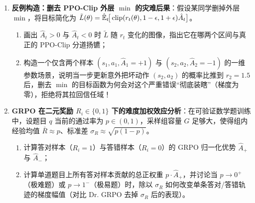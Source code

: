
\begin{enumerate}
  \item[\textbf{6.3.5}] \textbf{反例构造：删去 PPO-Clip 外层 $\min$ 的灾难后果}：假设某同学删掉外层 $\min$，将目标简化为 $\tilde{L}(\theta) = \hat{\mathbb{E}}_t\!\big[\operatorname{clip}(r_t(\theta), 1-\epsilon, 1+\epsilon)\hat{A}_t\big]$。
  \begin{enumerate}
    \item 画出 $\hat{A}_t > 0$ 与 $\hat{A}_t < 0$ 时 $\tilde{L}$ 随 $r_t$ 变化的图像，指出它在哪两个区间与真正的 PPO-Clip 分道扬镳；
    \item 构造一个仅含两个样本 $(s_1, a_1, \hat{A}_1 = +1)$ 与 $(s_2, a_2, \hat{A}_2 = -1)$ 的一维参数场景，说明当一步更新意外把坏动作 $(s_2, a_2)$ 的概率比推到 $r_2 = 1.5$ 后，删去 $\min$ 的目标函数为何会对这个严重错误“彻底装瞎”（梯度为零），拒绝将其拉回信任域！
  \end{enumerate}

  \item[\textbf{6.3.6}] \textbf{GRPO 在二元奖励 $R_i \in \{0, 1\}$ 下的难度加权效应分析}：在可验证数学题训练中，设题目 $q$ 当前的通过率为 $p \in (0, 1)$，采样组容量 $G$ 足够大，使得组内经验均值 $\bar{R} \approx p$、标准差 $\sigma_R \approx \sqrt{p(1-p)}$。
  \begin{enumerate}
    \item 计算答对样本（$R_i = 1$）与答错样本（$R_i = 0$）的 GRPO 归一化优势 $\hat{A}_+$ 与 $\hat{A}_-$；
    \item 计算单道题目上所有答对样本贡献的总正权重 $p \cdot \hat{A}_+$，并讨论当 $p \to 0^+$（极难题）或 $p \to 1^-$（极易题）时，除以 $\sigma_R$ 如何改变单条答对/答错轨迹的梯度幅值（对比 Dr. GRPO 去掉 $\sigma_R$ 后的表现）。
  \end{enumerate}
\end{enumerate}


